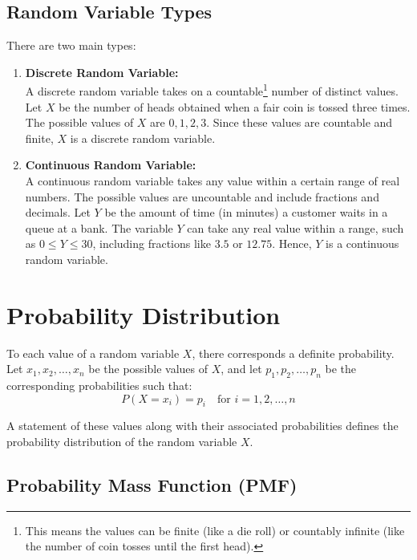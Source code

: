 \documentclass[twoside]{book}
\begin{document}
\subsection{Random Variable Types}

There are two main types:

\begin{enumerate}
    \item \textbf{Discrete Random Variable:} \\
    A discrete random variable takes on a countable\footnote{This means the values can be finite (like a die roll) or countably infinite (like the number of coin tosses until the first head).} number of distinct values. Let \( X \) be the number of heads obtained when a fair coin is tossed three times. 
    The possible values of \( X \) are \( 0, 1, 2, 3 \). Since these values are countable and finite, \( X \) is a discrete random variable.

    \item \textbf{Continuous Random Variable:} \\
    A continuous random variable takes any value within a certain range of real numbers. The possible values are uncountable and include fractions and decimals. Let \( Y \) be the amount of time (in minutes) a customer waits in a queue at a bank. 
    The variable \( Y \) can take any real value within a range, such as \( 0 \leq Y \leq 30 \), including fractions like \( 3.5 \) or \( 12.75 \). Hence, \( Y \) is a continuous random variable.
\end{enumerate}

\section{Probability Distribution}

To each value of a random variable \( X \), there corresponds a definite probability.  
Let \( x_1, x_2, \dots, x_n \) be the possible values of \( X \), and let \( p_1, p_2, \dots, p_n \) be the corresponding probabilities such that:
\[
P(X = x_i) = p_i \quad \text{for } i = 1, 2, \dots, n
\]

A statement of these values along with their associated probabilities defines the {probability distribution} of the random variable \( X \).

\subsection{Probability Mass Function (PMF)}
\end{document}
